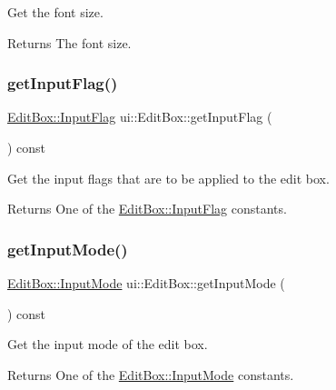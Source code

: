 Get the font size. \begin{DoxyReturn}{Returns}
The font size. 
\end{DoxyReturn}
\mbox{\label{classui_1_1EditBox_a376fa08f66d2a3f6741a93d76b4ea1dc}} 
\subsubsection{\texorpdfstring{get\+Input\+Flag()}{getInputFlag()}}
{\footnotesize\ttfamily \hyperlink{classui_1_1EditBox_af02f13ee9fba51d59bb3111e200848c8}{Edit\+Box\+::\+Input\+Flag} ui\+::\+Edit\+Box\+::get\+Input\+Flag (\begin{DoxyParamCaption}{ }\end{DoxyParamCaption}) const}

Get the input flags that are to be applied to the edit box. \begin{DoxyReturn}{Returns}
One of the \hyperlink{classui_1_1EditBox_af02f13ee9fba51d59bb3111e200848c8}{Edit\+Box\+::\+Input\+Flag} constants. 
\end{DoxyReturn}
\mbox{\label{classui_1_1EditBox_aca9e89e806845c12585cecb69468b7f9}} 
\subsubsection{\texorpdfstring{get\+Input\+Mode()}{getInputMode()}}
{\footnotesize\ttfamily \hyperlink{classui_1_1EditBox_a7a1bfe8f3ba218bedfcf5451ec3ce01a}{Edit\+Box\+::\+Input\+Mode} ui\+::\+Edit\+Box\+::get\+Input\+Mode (\begin{DoxyParamCaption}{ }\end{DoxyParamCaption}) const}

Get the input mode of the edit box. \begin{DoxyReturn}{Returns}
One of the \hyperlink{classui_1_1EditBox_a7a1bfe8f3ba218bedfcf5451ec3ce01a}{Edit\+Box\+::\+Input\+Mode} constants. 
\end{DoxyReturn}
\mbox{\label{classui_1_1EditBox_acd8e23e5b2db7c3b27a8e7cf9ce320c3}} 
